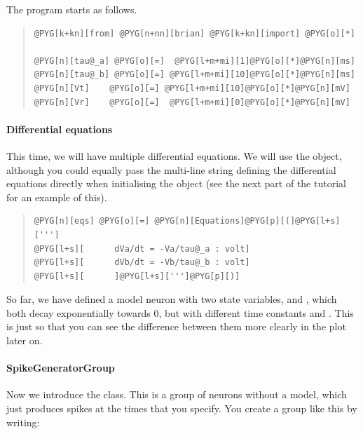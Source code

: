 \documentclass[letterpaper,10pt,english]{manual}
\begin{document}
The program starts as follows.
\begin{quote}

\begin{Verbatim}[commandchars=@\[\]]
@PYG[k+kn][from] @PYG[n+nn][brian] @PYG[k+kn][import] @PYG[o][*]

@PYG[n][tau@_a] @PYG[o][=]  @PYG[l+m+mi][1]@PYG[o][*]@PYG[n][ms]
@PYG[n][tau@_b] @PYG[o][=] @PYG[l+m+mi][10]@PYG[o][*]@PYG[n][ms]
@PYG[n][Vt]    @PYG[o][=] @PYG[l+m+mi][10]@PYG[o][*]@PYG[n][mV]
@PYG[n][Vr]    @PYG[o][=]  @PYG[l+m+mi][0]@PYG[o][*]@PYG[n][mV]
\end{Verbatim}
\end{quote}


\paragraph{Differential equations}

This time, we will have multiple differential equations. We will use the
\hyperlink{brian.Equations}{} object, although you could equally pass the multi-line string
defining the differential equations directly when initialising the \hyperlink{brian.NeuronGroup}{}
object (see the next part of the tutorial for an example of this).
\begin{quote}

\begin{Verbatim}[commandchars=@\[\]]
@PYG[n][eqs] @PYG[o][=] @PYG[n][Equations]@PYG[p][(]@PYG[l+s][''']
@PYG[l+s][      dVa/dt = -Va/tau@_a : volt]
@PYG[l+s][      dVb/dt = -Vb/tau@_b : volt]
@PYG[l+s][      ]@PYG[l+s][''']@PYG[p][)]
\end{Verbatim}
\end{quote}

So far, we have defined a model neuron with two state variables, 
and , which both decay exponentially towards 0, but with different
time constants  and . This is just so that you can see
the difference between them more clearly in the plot later on.


\paragraph{SpikeGeneratorGroup}

Now we introduce the \hyperlink{brian.SpikeGeneratorGroup}{} class. This is a group of
neurons without a model, which just produces spikes at the times
that you specify. You create a group like this by writing:
\end{document}
